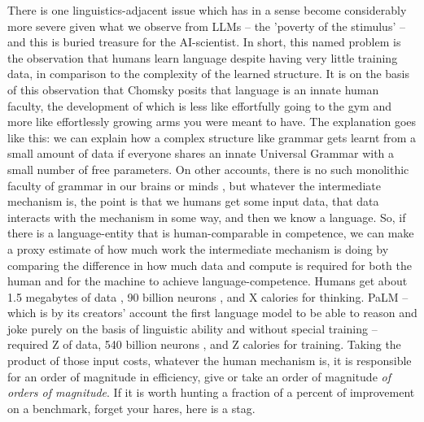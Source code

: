 There is one linguistics-adjacent issue which has in a sense become considerably more severe given what we observe from LLMs -- the 'poverty of the stimulus' -- and this is buried treasure for the AI-scientist. In short, this named problem is the observation that humans learn language despite having very little training data, in comparison to the complexity of the learned structure. It is on the basis of this observation that Chomsky posits \cite{} that language is an innate human faculty, the development of which is less like effortfully going to the gym and more like effortlessly growing arms you were meant to have. The explanation goes like this: we can explain how a complex structure like grammar gets learnt from a small amount of data if everyone shares an innate Universal Grammar with a small number of free parameters. On other accounts, there is no such monolithic faculty of grammar in our brains or minds \cite{}, but whatever the intermediate mechanism is, the point is that we humans get some input data, that data interacts with the mechanism in some way, and then we know a language. So, if there is a language-entity that is human-comparable in competence, we can make a proxy estimate of how much work the intermediate mechanism is doing by comparing the difference in how much data and compute is required for both the human and for the machine to achieve language-competence. Humans get about 1.5 megabytes of data \cite{}, 90 billion neurons \cite{}, and X calories for thinking. PaLM -- which is by its creators' account the first language model to be able to reason and joke purely on the basis of linguistic ability and without special training \cite{} -- required Z of data, 540 billion neurons \cite{}, and Z calories for training. Taking the product of those input costs, whatever the human mechanism is, it is responsible for an order of magnitude in efficiency, give or take an order of magnitude \emph{of orders of magnitude}. If it is worth hunting a fraction of a percent of improvement on a benchmark, forget your hares, here is a stag.\\


